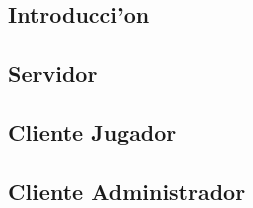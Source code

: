 \subsection{Introducci'on}


\subsection{Servidor}


\subsection{Cliente Jugador}


\subsection{Cliente Administrador}

